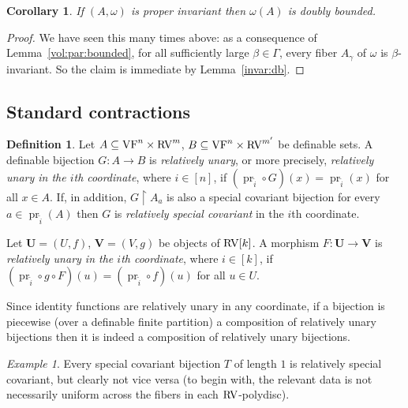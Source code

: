 \documentclass[12pt]{amsart}
\newcommand{\memph}[1]{{\color{magenta}\emph{#1}}}
\theoremstyle{plain}
\newtheorem{cor}[thm]{Corollary}
\theoremstyle{definition}
\newtheorem{defn}[thm]{Definition}
\theoremstyle{remark}
\newtheorem{exam}[thm]{Example}
\numberwithin{equation}{section}
\theoremstyle{plain}
\newcommand{\VF}{\textup{VF}}
\newcommand{\RV}{\textup{RV}}
\DeclareMathOperator{\pr}{pr}
\newcommand{\0}{\emptyset}
\newcommand{\rest}{\upharpoonright}
\newcommand{\fun}{\longrightarrow}
\newcommand{\sub}{\subseteq}
\begin{document}
\begin{cor}
If $(A, \omega)$ is proper invariant then $\omega(A)$ is doubly bounded.
\end{cor}
\begin{proof}
We have seen this many times above: as a consequence of Lemma~\ref{vol:par:bounded}, for all sufficiently large $\beta \in \Gamma$, every fiber $A_\gamma$ of $\omega$ is $\beta$-invariant. So the claim is immediate by Lemma~\ref{invar:db}.
\end{proof}

\subsection{Standard contractions}

\begin{defn}\label{rela:unary}
Let $A \sub \VF^{n} \times \RV^{m}$, $B \sub \VF^{n} \times \RV^{m'}$ be definable sets. A definable bijection $G : A \fun B$ is \memph{relatively unary}, or more precisely, \memph{relatively unary in the $i$th coordinate}, where $i \in [n]$, if $(\pr_{\tilde{i}} \circ G)(x) = \pr_{\tilde{i}}(x)$ for all $x \in A$. If, in addition, $G \rest A_a$ is also a special covariant bijection for every $a \in \pr_{\tilde{i}} (A)$ then $G$ is \memph{relatively special covariant} in the $i$th coordinate.

Let $\bm U = (U, f)$, $\bm V = (V, g)$ be objects of $\RV[k]$. A morphism $F : \bm U \fun \bm V$ is \memph{relatively unary in the $i$th coordinate}, where $i \in [k]$, if $(\pr_{\tilde{i}} \circ g \circ F)(u) = (\pr_{\tilde{i}} \circ f)(u)$ for all $u \in U$.
\end{defn}

Since identity functions are relatively unary in any coordinate, if a  bijection  is piecewise (over a definable finite partition) a composition of relatively unary bijections then it is indeed a composition of relatively unary bijections.

\begin{exam}
Every  special covariant bijection $T$ of length $1$ is relatively special covariant, but clearly not vice versa (to begin with, the relevant data is not necessarily uniform across the fibers in each $\RV$-polydisc).
\end{exam}
\end{document}
